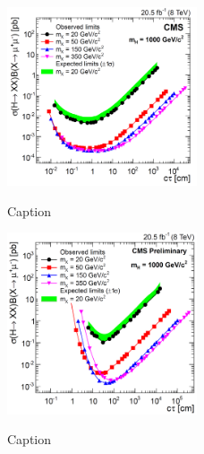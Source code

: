 \begin{figure}
    \centering
    \caption{Caption}
    \includegraphics[width=0.5\textwidth]{fig/LpetonicCMStrackerMuMu.png}
    \label{fig:LpetonicCMStrackerMuMu}
\end{figure}

\begin{figure}
    \centering
    \caption{Caption}
    \includegraphics[width=0.5\textwidth]{fig/LpetonicCMSMSMuMu.png}
    \label{fig:LpetonicCMSMSMuMu}
\end{figure}


